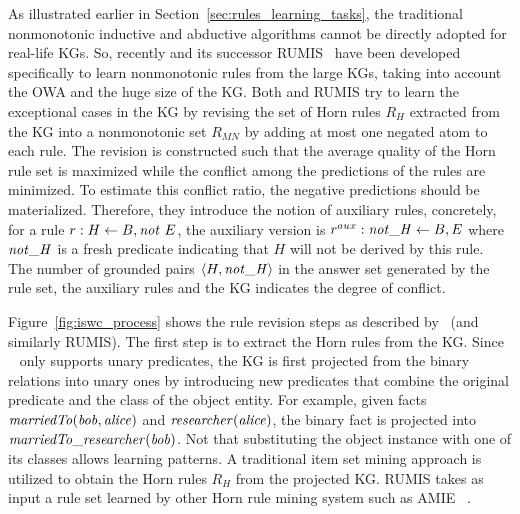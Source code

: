 As illustrated earlier in Section~\ref{sec:rules_learning_tasks}, the traditional nonmonotonic inductive and abductive algorithms cannot be directly adopted for real-life KGs.
So, recently \cite{gad2016} and its successor RUMIS~\cite{rumis} have been developed specifically to learn nonmonotonic rules from the large KGs, taking into account the OWA and the huge size of the KG. Both \cite{gad2016} and RUMIS try to learn the exceptional cases in the KG by revising the set of Horn rules $R_H$ extracted from the KG into a nonmonotonic set $R_{MN}$ by adding at most one negated atom to each rule. The revision is constructed such that the average quality of the Horn rule set is maximized while the conflict among the predictions of the rules are minimized. To estimate this conflict ratio, the negative predictions should be materialized. Therefore, they introduce the notion of auxiliary rules, concretely, for a rule 
$r:H \leftarrow B, \mathit{not}~ E$, the auxiliary version is $r^{aux}:\mathit{not\_H} \leftarrow B, E$ where $\mathit{not\_H}$ is a fresh predicate indicating that $H$ will not be derived by this rule. The number of grounded pairs $\langle H,\mathit{not\_H}\rangle$ in the answer set generated by the rule set, the auxiliary rules and the KG indicates the degree of conflict.


Figure~\ref{fig:iswc_process} shows the rule revision steps as described by~\cite{gad2016} (and similarly RUMIS). The first step is to extract the Horn rules from the KG. Since ~\cite{gad2016} only supports unary predicates, the KG is first projected from the binary relations into unary ones by introducing new predicates that combine the original predicate and the class of the object entity. For example, given facts $\mathit{marriedTo(bob, alice)}$ and $\mathit{researcher(alice)}$, the binary fact is projected into $\mathit{marriedTo\_researcher(bob)}$. Not that substituting the object instance with one of its classes allows learning patterns. A traditional item set mining approach is utilized to obtain the Horn rules $R_H$ from the projected KG. RUMIS takes as input a rule set learned by other Horn rule mining system such as AMIE ~\cite{amie}.   


